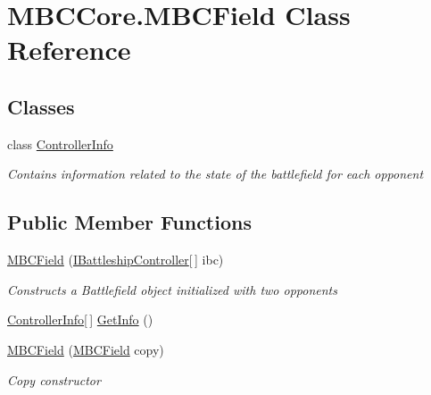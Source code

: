 \hypertarget{class_m_b_c_core_1_1_m_b_c_field}{\section{M\-B\-C\-Core.\-M\-B\-C\-Field Class Reference}
\label{class_m_b_c_core_1_1_m_b_c_field}
}
\subsection*{Classes}
\begin{DoxyCompactItemize}
\item 
class \hyperlink{class_m_b_c_core_1_1_m_b_c_field_1_1_controller_info}{Controller\-Info}
\begin{DoxyCompactList}\small\item\em Contains information related to the state of the battlefield for each opponent\end{DoxyCompactList}\end{DoxyCompactItemize}
\subsection*{Public Member Functions}
\begin{DoxyCompactItemize}
\item 
\hypertarget{class_m_b_c_core_1_1_m_b_c_field_a96fb420cc33032003907bbf7aad6d716}{\hyperlink{class_m_b_c_core_1_1_m_b_c_field_a96fb420cc33032003907bbf7aad6d716}{M\-B\-C\-Field} (\hyperlink{interface_m_b_c_core_1_1_i_battleship_controller}{I\-Battleship\-Controller}\mbox{[}$\,$\mbox{]} ibc)}\label{class_m_b_c_core_1_1_m_b_c_field_a96fb420cc33032003907bbf7aad6d716}

\begin{DoxyCompactList}\small\item\em Constructs a Battlefield object initialized with two opponents\end{DoxyCompactList}\item 
\hyperlink{class_m_b_c_core_1_1_m_b_c_field_1_1_controller_info}{Controller\-Info}\mbox{[}$\,$\mbox{]} \hyperlink{class_m_b_c_core_1_1_m_b_c_field_a746e83aeed620fe97616b09c46f38267}{Get\-Info} ()
\item 
\hypertarget{class_m_b_c_core_1_1_m_b_c_field_a8a96e9f1da2a5c9d8f335befc37608d5}{\hyperlink{class_m_b_c_core_1_1_m_b_c_field_a8a96e9f1da2a5c9d8f335befc37608d5}{M\-B\-C\-Field} (\hyperlink{class_m_b_c_core_1_1_m_b_c_field}{M\-B\-C\-Field} copy)}\label{class_m_b_c_core_1_1_m_b_c_field_a8a96e9f1da2a5c9d8f335befc37608d5}

\begin{DoxyCompactList}\small\item\em Copy constructor\end{DoxyCompactList}\end{DoxyCompactItemize}
